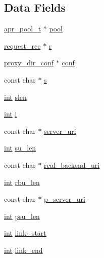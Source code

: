 \subsection*{Data Fields}
\begin{DoxyCompactItemize}
\item 
\hyperlink{structapr__pool__t}{apr\+\_\+pool\+\_\+t} $\ast$ \hyperlink{structlink__ctx_a6e2e678f2b78d117d926f8356e1f5cbb}{pool}
\item 
\hyperlink{structrequest__rec}{request\+\_\+rec} $\ast$ \hyperlink{structlink__ctx_ae9d77fe762bf1a02301c3b437a3b44fa}{r}
\item 
\hyperlink{structproxy__dir__conf}{proxy\+\_\+dir\+\_\+conf} $\ast$ \hyperlink{structlink__ctx_a7dcc6d00cbd614a33b8c79a3815a3299}{conf}
\item 
const char $\ast$ \hyperlink{structlink__ctx_a14e856e2601e7577d7d309ba95a0f285}{s}
\item 
\hyperlink{pcre_8txt_a42dfa4ff673c82d8efe7144098fbc198}{int} \hyperlink{structlink__ctx_aa58573da167852a59941a861393c517c}{slen}
\item 
\hyperlink{pcre_8txt_a42dfa4ff673c82d8efe7144098fbc198}{int} \hyperlink{structlink__ctx_af4ec833d0c4135dd1f5c4d969e7af6a9}{i}
\item 
const char $\ast$ \hyperlink{structlink__ctx_a7c623dde91255bcdf24411aff3a7ffbd}{server\+\_\+uri}
\item 
\hyperlink{pcre_8txt_a42dfa4ff673c82d8efe7144098fbc198}{int} \hyperlink{structlink__ctx_af4ad908341ceba9edac7097462c86ed1}{su\+\_\+len}
\item 
const char $\ast$ \hyperlink{structlink__ctx_a276e0e36d689dcbec3474d811861243c}{real\+\_\+backend\+\_\+uri}
\item 
\hyperlink{pcre_8txt_a42dfa4ff673c82d8efe7144098fbc198}{int} \hyperlink{structlink__ctx_aef7bb2f2f8445393a3710bfb6680b4fe}{rbu\+\_\+len}
\item 
const char $\ast$ \hyperlink{structlink__ctx_a6eb60d22a74569c24fdd9fb6714eab23}{p\+\_\+server\+\_\+uri}
\item 
\hyperlink{pcre_8txt_a42dfa4ff673c82d8efe7144098fbc198}{int} \hyperlink{structlink__ctx_ab217e0cfa78fc89271ccfe1a0c43e299}{psu\+\_\+len}
\item 
\hyperlink{pcre_8txt_a42dfa4ff673c82d8efe7144098fbc198}{int} \hyperlink{structlink__ctx_aa56d5420ff56f6e854abb05d3143e019}{link\+\_\+start}
\item 
\hyperlink{pcre_8txt_a42dfa4ff673c82d8efe7144098fbc198}{int} \hyperlink{structlink__ctx_a76366fc1717453c8fead0e99df0d1649}{link\+\_\+end}

\end{DoxyCompactItemize}
